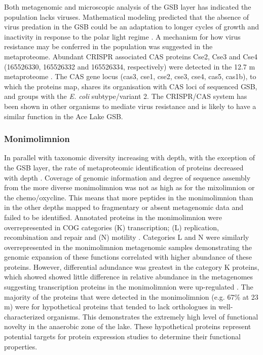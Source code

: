 Both metagenomic and microscopic analysis of the \ac{GSB} layer has indicated the population lacks viruses.
Mathematical modeling predicted that the absence of virus predation in the \ac{GSB} could be an adaptation to longer cycles of growth and inactivity in response to the polar light regime \cite{Lauro2011}. 
A mechanism for how virus resistance may be conferred in the population was suggested in the metaproteome.
Abundant \ac{CRISPR} associated \ac{CAS} proteins Cse2, Cse3 and Cse4 (165526330, 165526332 and 165526334, respectively) were detected in the 12.7 m metaproteome . 
The \ac{CAS} gene locus (cas3, cse1, cse2, cse3, cse4, cas5, cas1b), to which the proteins map, shares its organisation with \ac{CAS} loci of sequenced \ac{GSB}, and groups with the \emph{E. coli} subtype/variant 2. 
The \ac{CRISPR}/\ac{CAS} system has been shown in other organisms to mediate virus resistance \cite{Karginov2010, Horvath2010} and is likely to have a similar function in the Ace Lake \ac{GSB}.


\subsubsection{Monimolimnion}
In parallel with taxonomic diversity increasing with depth, with the exception of the \ac{GSB} layer, the rate of metaproteomic identification of proteins decreased with depth .
Coverage of genomic information and degree of sequence assembly from the more diverse monimolimnion was not as high as for the mixolimnion or the chemo/oxycline.
This means that more peptides in the monimolimnion than in the other depths mapped to fragmentary or absent metagenomic data and failed to be identified.
Annotated proteins in the monimolimnion were overrepresented in \ac{COG} categories (K) transcription; (L) replication, recombination and repair and (N) motility . 
Categories L and N were similarly overrepresented in the monimolimnion metagenomic samples \cite{Lauro2011} demonstrating the genomic expansion of these functions correlated with higher abundance of these proteins.
However, differential adundance was greatest in the category K proteins, which showed showed little difference in relative abundance in the metagenomes \cite{Lauro2011} suggesting transcription proteins in the monimolimnion were up-regulated . 
The majority of the proteins that were detected in the monimolimnion (e.g. 67\% at 23 m)  were for hypothetical proteins that tended to lack orthologues in well-characterized organisms.
This demonstrates the extremely high level of functional novelty in the anaerobic zone of the lake.
These hypothetical proteins represent potential targets for protein expression studies to determine their functional properties.


